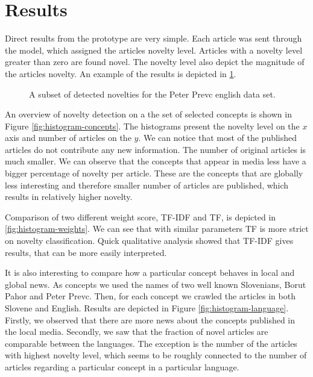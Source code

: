 \documentclass{acm_proc_article-sp}
\begin{document}
\section{Results}\label{section:results}
Direct results from the prototype are very simple. Each article was sent through the model, which assigned the articles novelty level. Articles with a novelty level greater than zero are found novel. The novelty level also depict the magnitude of the articles novelty. An example of the results is depicted in \ref{fig:resultList}.

\begin{figure}[h]
\centering
{}
\caption{A subset of detected novelties for the Peter Prevc english data set.}
\label{fig:resultList}
\end{figure}

An overview of novelty detection on a the set of selected concepts is shown in Figure \ref{fig:histogram-concepts}. The histograms present the novelty level on the $x$ axis and number of articles on the $y$. We can notice that most of the published articles do not contribute any new information. The number of original articles is much smaller. We can observe that the concepts that appear in media less have a bigger percentage of novelty per article. These are the concepts that are globally less interesting and therefore smaller number of articles are published, which results in relatively higher novelty.

Comparison of two different weight score, TF-IDF and TF, is depicted in \ref{fig:histogram-weights}. We can see that with similar parameters TF is more strict on novelty classification. Quick qualitative analysis showed that TF-IDF gives results, that can be more easily interpreted.

It is also interesting to compare how a particular concept behaves in local and global news. As concepts we used the names of two well known Slovenians, Borut Pahor and Peter Prevc. Then, for each concept we crawled the articles in both Slovene and English. Results are depicted in Figure \ref{fig:histogram-language}. Firstly, we observed that there are more news about the concepts published in the local media. Secondly, we saw that the fraction of novel articles are comparable between the languages. The exception is the number of the articles with highest novelty level, which seems to be roughly connected to the number of articles regarding a particular concept in a particular language.
\end{document}
